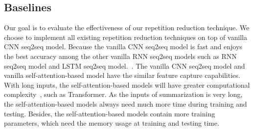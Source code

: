 \subsection{Baselines}
Our goal is to evaluate the
effectiveness of our repetition reduction technique.
We choose to implement 
all existing repetition reduction techniques on top of vanilla CNN seq2seq model.
Because the vanilla CNN seq2seq model is fast and enjoys the best accuracy among
the other vanilla RNN seq2seq models such as 
RNN seq2seq model and LSTM seq2seq model.~\citep{bai2018empirical,gehring2017convs2s}.
The vanilla CNN seq2seq model and vanilla self-attention-based model have the similar
feature capture capabilities.
With long inputs, the self-attention-based models
will have greater computational complexity~\citep{CompareTrans}, such as Transformer. 
As the inputs of summarization is very long, the self-attention-based models
always need much more time during training and testing.
Besides, the self-attention-based models contain more training parameters,
which need the memory usage at training and testing time. 



